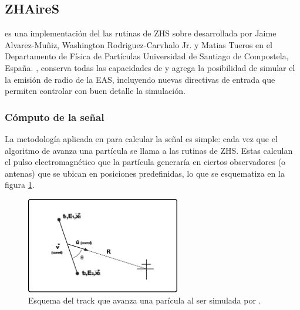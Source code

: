 	
	\subsection{ZHAireS}
	\label{sbsc:zhaires}

	\zhs{} es una implementaci\'on del las rutinas de ZHS \cite{1_halzen_zas_stanev_1991,2_zas_halzen_stanev_1992} sobre \aires{} desarrollada por Jaime Alvarez-Muñiz, Washington Rodriguez-Carvhalo Jr. y Matias Tueros en el Departamento de Física de Partículas Universidad de Santiago de Compostela, España.
	\zhs{}, conserva todas las capacidades de \aires{} y agrega la posibilidad de simular el la emisi\'on de radio de la EAS, incluyendo nuevas directivas de entrada que permiten controlar con buen detalle la simulación.

		\subsubsection{C\'omputo de la se\~nal}
		
		La metodolog\'ia aplicada en \zhs{} para calcular la se\~nal es simple: cada vez que el algoritmo de \aires{} avanza una part\'icula se llama a las rutinas de ZHS.
		Estas calculan el pulso electromagn\'etico que la partícula generar\'ia en ciertos observadores (o antenas) que se ubican en posiciones predefinidas, lo que se esquematiza en la figura \ref{fig:trackSch}.
		\begin{figure}[ht!]
		\centering
			\includegraphics[width=0.6\textwidth]{fig/simulacionRadio/trackSch}
			\caption{\label{fig:trackSch} Esquema del track que avanza una par\'icula al ser simulada por \aires{}.}
		\end{figure}
		

